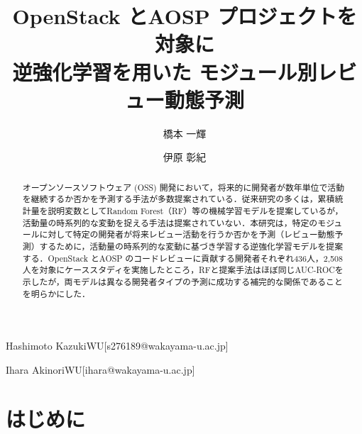 \documentclass[submit,noauthor,ses,dvipdfmx]{ipsj}
\newcommand{\todo}[1]{\colorbox{yellow}{{\bf TODO}:}{\color{red} {\textbf{[#1]}}}}
\begin{document}
\raggedbottom


\title{OpenStack とAOSP プロジェクトを対象に\\逆強化学習を用いた
モジュール別レビュー動態予測}




\author{橋本  一輝}{Hashimoto Kazuki}{WU}[s276189@wakayama-u.ac.jp]
\author{伊原  彰紀}{Ihara Akinori}{WU}[ihara@wakayama-u.ac.jp]

\vspace{-4mm}
\begin{abstract}
オープンソースソフトウェア (OSS) 開発において，将来的に開発者が数年単位で活動を継続するか否かを予測する手法が多数提案されている．従来研究の多くは，累積統計量を説明変数としてRandom Forest（RF）等の機械学習モデルを提案しているが，活動量の時系列的な変動を捉える手法は提案されていない．本研究は，特定のモジュールに対して特定の開発者が将来レビュー活動を行うか否かを予測（レビュー動態予測）するために，活動量の時系列的な変動に基づき学習する逆強化学習モデルを提案する．OpenStack とAOSP のコードレビューに貢献する開発者それぞれ436人，2{,}508人を対象にケーススタディを実施したところ，RFと提案手法はほぼ同じAUC-ROCを示したが，両モデルは異なる開発者タイプの予測に成功する補完的な関係であることを明らかにした．

\end{abstract}

\maketitle

\section{はじめに}\label{sec:Introduction}
\end{document}
